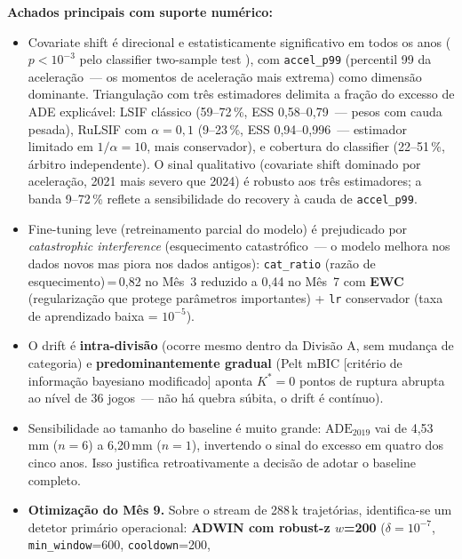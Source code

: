 \documentclass[11pt,a4paper]{article}
\begin{document}
\textbf{Achados principais com suporte num\'erico:}
\begin{itemize}[leftmargin=1.4em,itemsep=2pt]
    \item Covariate shift \'e direcional e estatisticamente significativo em todos os anos ($p\!<\!10^{-3}$ pelo classifier two-sample test \cite{lopezpaz2017}), com \texttt{accel\_p99} (percentil 99 da acelera\c{c}\~ao~--- os momentos de acelera\c{c}\~ao mais extrema) como dimens\~ao dominante. Triangula\c{c}\~ao com tr\^es estimadores delimita a fra\c{c}\~ao do excesso de ADE explic\'avel: LSIF cl\'assico (59--72\,\%, ESS 0{,}58--0{,}79~--- pesos com cauda pesada), RuLSIF \cite{yamada2013} com $\alpha\!=\!0{,}1$ (9--23\,\%, ESS 0{,}94--0{,}996~--- estimador limitado em $1/\alpha\!=\!10$, mais conservador), e cobertura do classifier (22--51\,\%, \'arbitro independente). O sinal qualitativo (covariate shift dominado por acelera\c{c}\~ao, 2021 mais severo que 2024) \'e robusto aos tr\^es estimadores; a banda 9--72\,\% reflete a sensibilidade do recovery \`a cauda de \texttt{accel\_p99}.
    \item Fine-tuning leve (retreinamento parcial do modelo) \'e prejudicado por \emph{catastrophic interference} (esquecimento catastr\'ofico~--- o modelo melhora nos dados novos mas piora nos dados antigos): \texttt{cat\_ratio} (raz\~ao de esquecimento)\,=\,0{,}82 no M\^es~3 reduzido a 0{,}44 no M\^es~7 com \textbf{EWC} (regula\-ri\-za\-\c{c}\~ao que protege par\^ametros importantes) + \texttt{lr} conservador (taxa de aprendizado baixa = $10^{-5}$).
    \item O drift \'e \textbf{intra-divis\~ao} (ocorre mesmo dentro da Divis\~ao A, sem mudan\c{c}a de categoria) e \textbf{predominantemente gradual} (Pelt mBIC [crit\'erio de informa\c{c}\~ao bayesiano modificado] aponta $K^*\!=\!0$ pontos de ruptura abrupta ao n\'ivel de 36 jogos~--- n\~ao h\'a quebra s\'ubita, o drift \'e cont\'inuo).
    \item Sensibilidade ao tamanho do baseline \'e muito grande:
          $\mathrm{ADE}_{2019}$ vai de 4{,}53\,mm ($n{=}6$) a 6{,}20\,mm
          ($n{=}1$), invertendo o sinal do excesso em quatro dos cinco
          anos. Isso justifica retroativamente a decis\~ao de adotar o
          baseline completo.
    \item \textbf{Otimiza\c{c}\~ao do M\^es 9.} Sobre o stream de 288\,k
          trajet\'orias, identifica-se um detetor prim\'ario operacional:
          \textbf{ADWIN com robust-z $w$=200} ($\delta\!=\!10^{-7}$,
          \texttt{min\_window}=600, \texttt{cooldown}=200,

\end{itemize}
\end{document}
